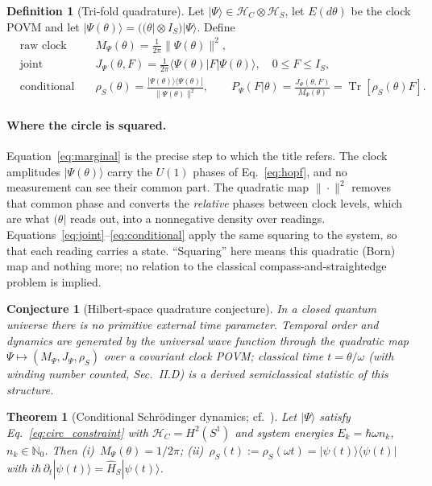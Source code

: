 \documentclass[aps,prd,onecolumn,notitlepage,10pt,amsmath,amssymb,amsfonts,nofootinbib]{revtex4-2}
\newtheorem{theorem}{Theorem}
\newtheorem{conjecture}{Conjecture}
\theoremstyle{definition}
\newtheorem{definition}{Definition}
\theoremstyle{remark}
\newcommand{\Hil}{\mathcal{H}}
\newcommand{\Hs}{\widehat{H}_S}
\newcommand{\N}{\mathbb{N}}
\newcommand{\Tr}{\operatorname{Tr}}
\newcommand{\pbra}[1]{(#1|}
\begin{document}
\begin{definition}[Tri-fold quadrature]
\label{def:trifold}
Let $|\Psi\rangle\in\Hil_C\otimes\Hil_S$, let $E(d\theta)$ be the clock POVM and let $|\Psi(\theta)\rangle=(\pbra{\theta}\otimes I_S)|\Psi\rangle$. Define
\begin{align}
  &\text{raw clock marginal:} && M_\Psi(\theta)=\tfrac{1}{2\pi}\|\Psi(\theta)\|^2, \label{eq:marginal}\\
  &\text{joint quadrature:} && J_\Psi(\theta,F)=\tfrac{1}{2\pi}\langle\Psi(\theta)|F|\Psi(\theta)\rangle,\quad 0\le F\le I_S, \label{eq:joint}\\
  &\text{conditional state:} && \rho_S(\theta)=\frac{|\Psi(\theta)\rangle\langle\Psi(\theta)|}{\|\Psi(\theta)\|^2},\qquad P_\Psi(F|\theta)=\frac{J_\Psi(\theta,F)}{M_\Psi(\theta)}=\Tr[\rho_S(\theta)F]. \label{eq:conditional}
\end{align}
\end{definition}

\paragraph*{Where the circle is squared.}
Equation~\eqref{eq:marginal} is the precise step to which the title refers. The clock amplitudes $|\Psi(\theta)\rangle$ carry the $U(1)$ phases of Eq.~\eqref{eq:hopf}, and no measurement can see their common part. The quadratic map $\|\cdot\|^2$ removes that common phase and converts the \emph{relative} phases between clock levels, which are what $\pbra{\theta}$ reads out, into a nonnegative density over readings. Equations~\eqref{eq:joint}--\eqref{eq:conditional} apply the same squaring to the system, so that each reading carries a state. ``Squaring'' here means this quadratic (Born) map and nothing more; no relation to the classical compass-and-straightedge problem is implied.

\begin{conjecture}[Hilbert-space quadrature conjecture]
\label{conj:main}
In a closed quantum universe there is no primitive external time parameter. Temporal order and dynamics are generated by the universal wave function through the quadratic map $\Psi\mapsto(M_\Psi,J_\Psi,\rho_S)$ over a covariant clock POVM; classical time $t=\theta/\omega$ (with winding number counted, Sec.~II.D) is a derived semiclassical statistic of this structure.
\end{conjecture}

\begin{theorem}[Conditional Schr\"odinger dynamics; cf.~\cite{PageWootters1983,SmithAhmadi2019,Hohn2021}]
\label{thm:schrodinger}
Let $|\Psi\rangle$ satisfy Eq.~\eqref{eq:circ_constraint} with $\Hil_C=H^2(S^1)$ and system energies $E_k=\hbar\omega n_k$, $n_k\in\N_0$. Then (i)~$M_\Psi(\theta)=1/2\pi$; (ii)~$\rho_S(t):=\rho_S(\omega t)=|\psi(t)\rangle\langle\psi(t)|$ with $i\hbar\,\partial_t|\psi(t)\rangle=\Hs|\psi(t)\rangle$.
\end{theorem}
\end{document}
